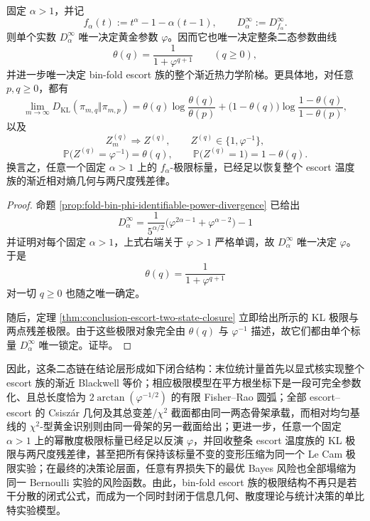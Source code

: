 \begin{theorem}\label{thm:conclusion-powerdiv-scalar-recovers-escort-thermo-ladder}
固定 \(\alpha>1\)，并记
\[
f_\alpha(t):=t^\alpha-1-\alpha(t-1),
\qquad
D_\alpha^\infty:=D_{f_\alpha}^\infty.
\]
则单个实数 \(D_\alpha^\infty\) 唯一决定黄金参数 \(\varphi\)。因而它也唯一决定整条二态参数曲线
\[
\theta(q)=\frac{1}{1+\varphi^{q+1}}
\qquad (q\ge 0),
\]
并进一步唯一决定 bin-fold escort 族的整个渐近热力学阶梯。更具体地，对任意 \(p,q\ge 0\)，都有
\[
\lim_{m\to\infty}D_{\mathrm{KL}}(\pi_{m,q}\Vert \pi_{m,p})
=
\theta(q)\log\frac{\theta(q)}{\theta(p)}
+
\bigl(1-\theta(q)\bigr)\log\frac{1-\theta(q)}{1-\theta(p)},
\]
以及
\[
Z_m^{(q)}\Rightarrow Z^{(q)},
\qquad
Z^{(q)}\in\{1,\varphi^{-1}\},
\]
\[
\mathbb P\bigl(Z^{(q)}=\varphi^{-1}\bigr)=\theta(q),
\qquad
\mathbb P\bigl(Z^{(q)}=1\bigr)=1-\theta(q).
\]
换言之，任意一个固定 \(\alpha>1\) 上的 \(f_\alpha\)-极限标量，已经足以恢复整个 escort 温度族的渐近相对熵几何与两尺度残差律。
\end{theorem}
\begin{proof}
命题 \ref{prop:fold-bin-phi-identifiable-power-divergence} 已给出
\[
D_\alpha^\infty
=
\frac{1}{5^{\alpha/2}}
\bigl(\varphi^{2\alpha-1}+\varphi^{\alpha-2}\bigr)-1
\]
并证明对每个固定 \(\alpha>1\)，上式右端关于 \(\varphi>1\) 严格单调，故 \(D_\alpha^\infty\) 唯一决定 \(\varphi\)。于是
\[
\theta(q)=\frac{1}{1+\varphi^{q+1}}
\]
对一切 \(q\ge 0\) 也随之唯一确定。

随后，定理 \ref{thm:conclusion-escort-two-state-closure} 立即给出所示的 KL 极限与两点残差极限。由于这些极限对象完全由 \(\theta(q)\) 与 \(\varphi^{-1}\) 描述，故它们都由单个标量 \(D_\alpha^\infty\) 唯一锁定。证毕。
\end{proof}



\noindent
因此，这条二态链在结论层形成如下闭合结构：末位统计量首先以显式核实现整个 escort 族的渐近 Blackwell 等价；相应极限模型在平方根坐标下是一段可完全参数化、且总长度恰为 \(2\arctan(\varphi^{-1/2})\) 的有限 Fisher--Rao 圆弧；全部 escort--escort 的 Csiszár 几何及其总变差/\(\chi^2\) 截面都由同一两态骨架承载，而相对均匀基线的 \(\chi^2\)-型黄金识别则由同一骨架的另一截面给出；更进一步，任意一个固定 \(\alpha>1\) 上的幂散度极限标量已经足以反演 \(\varphi\)，并回收整条 escort 温度族的 KL 极限与两尺度残差律，甚至把所有保持该标量不变的变形压缩为同一个 Le Cam 极限实验；在最终的决策论层面，任意有界损失下的最优 Bayes 风险也全部塌缩为同一 Bernoulli 实验的风险函数。由此，bin-fold escort 族的极限结构不再只是若干分散的闭式公式，而成为一个同时封闭于信息几何、散度理论与统计决策的单比特实验模型。

\endinput
